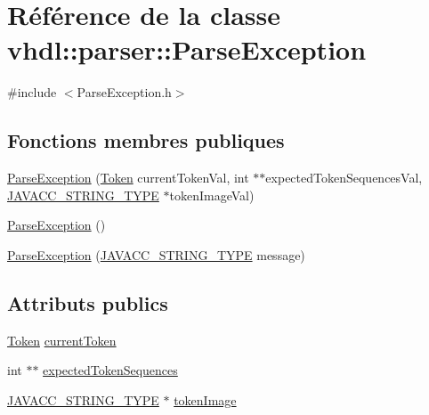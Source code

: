 \hypertarget{classvhdl_1_1parser_1_1_parse_exception}{}\section{Référence de la classe vhdl\+:\+:parser\+:\+:Parse\+Exception}
\label{classvhdl_1_1parser_1_1_parse_exception}


{\ttfamily \#include $<$Parse\+Exception.\+h$>$}

\subsection*{Fonctions membres publiques}
\begin{DoxyCompactItemize}
\item 
\hyperlink{classvhdl_1_1parser_1_1_parse_exception_aa1560102101159dc8718a4a163cc200b}{Parse\+Exception} (\hyperlink{classvhdl_1_1parser_1_1_token}{Token} current\+Token\+Val, int $\ast$$\ast$expected\+Token\+Sequences\+Val, \hyperlink{_java_c_c_8h_a7941da0682a76ffa9869d8458e166062}{J\+A\+V\+A\+C\+C\+\_\+\+S\+T\+R\+I\+N\+G\+\_\+\+T\+Y\+P\+E} $\ast$token\+Image\+Val)
\item 
\hyperlink{classvhdl_1_1parser_1_1_parse_exception_aa8dbc5d8f42a4cc3375d7d21340dc95e}{Parse\+Exception} ()
\item 
\hyperlink{classvhdl_1_1parser_1_1_parse_exception_ac72d242f046713ece19b1ca09b456930}{Parse\+Exception} (\hyperlink{_java_c_c_8h_a7941da0682a76ffa9869d8458e166062}{J\+A\+V\+A\+C\+C\+\_\+\+S\+T\+R\+I\+N\+G\+\_\+\+T\+Y\+P\+E} message)
\end{DoxyCompactItemize}
\subsection*{Attributs publics}
\begin{DoxyCompactItemize}
\item 
\hyperlink{classvhdl_1_1parser_1_1_token}{Token} \hyperlink{classvhdl_1_1parser_1_1_parse_exception_aadd2253ddf7f1c87444d51fc22efd9fe}{current\+Token}
\item 
int $\ast$$\ast$ \hyperlink{classvhdl_1_1parser_1_1_parse_exception_a28848a83d7553352654dd5ccb7ed40ef}{expected\+Token\+Sequences}
\item 
\hyperlink{_java_c_c_8h_a7941da0682a76ffa9869d8458e166062}{J\+A\+V\+A\+C\+C\+\_\+\+S\+T\+R\+I\+N\+G\+\_\+\+T\+Y\+P\+E} $\ast$ \hyperlink{classvhdl_1_1parser_1_1_parse_exception_a59256facf9b653896026ab05f0eb4728}{token\+Image}
\end{DoxyCompactItemize}


